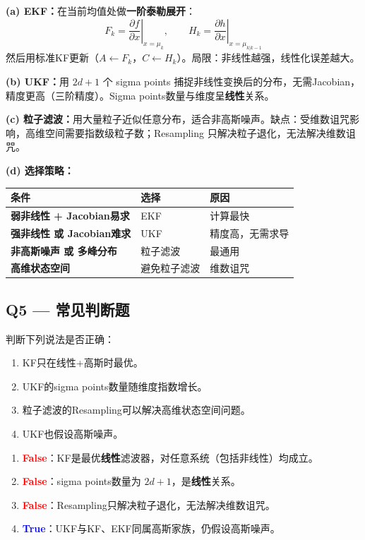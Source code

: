 \documentclass[12pt]{article}
\begin{document}
\begin{tcolorbox}[answerbox]
\textbf{(a) EKF：}在当前均值处做\textbf{一阶泰勒展开}：
\[
  F_k = \left.\frac{\partial f}{\partial x}\right|_{x=\mu_k}, \qquad
  H_k = \left.\frac{\partial h}{\partial x}\right|_{x=\mu_{k|k-1}}
\]
然后用标准KF更新（$A \leftarrow F_k$，$C \leftarrow H_k$）。局限：非线性越强，线性化误差越大。

\textbf{(b) UKF：}用 $2d+1$ 个 sigma points 捕捉非线性变换后的分布，无需Jacobian，精度更高（三阶精度）。Sigma points数量与维度呈\textbf{线性}关系。

\textbf{(c) 粒子滤波：}用大量粒子近似任意分布，适合非高斯噪声。缺点：受维数诅咒影响，高维空间需要指数级粒子数；Resampling 只解决粒子退化，无法解决维数诅咒。

\textbf{(d) 选择策略：}

\begin{center}
\begin{tabular}{>{\bfseries}p{4.5cm} p{2.5cm} p{4cm}}
\toprule
条件 & 选择 & 原因 \\
\midrule
弱非线性 + Jacobian易求 & EKF & 计算最快 \\
强非线性 或 Jacobian难求 & UKF & 精度高，无需求导 \\
非高斯噪声 或 多峰分布 & 粒子滤波 & 最通用 \\
高维状态空间 & 避免粒子滤波 & 维数诅咒 \\
\bottomrule
\end{tabular}
\end{center}
\end{tcolorbox}

\subsection*{Q5 --- 常见判断题}

\begin{tcolorbox}[questionbox]
判断下列说法是否正确：
\begin{enumerate}[label=(\alph*)]
  \item KF只在线性+高斯时最优。
  \item UKF的sigma points数量随维度指数增长。
  \item 粒子滤波的Resampling可以解决高维状态空间问题。
  \item UKF也假设高斯噪声。
\end{enumerate}
\end{tcolorbox}

\begin{tcolorbox}[answerbox]
\begin{enumerate}[label=(\alph*)]
  \item \textcolor{red}{\textbf{False}}：KF是最优\textbf{线性}滤波器，对任意系统（包括非线性）均成立。
  \item \textcolor{red}{\textbf{False}}：sigma points数量为 $2d+1$，是\textbf{线性}关系。
  \item \textcolor{red}{\textbf{False}}：Resampling只解决粒子退化，无法解决维数诅咒。
  \item \textcolor{blue}{\textbf{True}}：UKF与KF、EKF同属高斯家族，仍假设高斯噪声。
\end{enumerate}
\end{tcolorbox}
\end{document}
